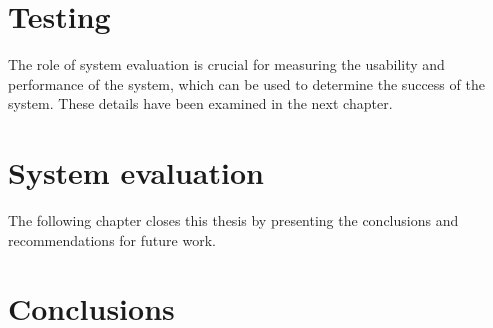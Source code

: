 \documentclass[
	paper=A4,
	titlepage=true,
	appendixprefix=true,
	headings=appendixwithoutprefixline,
	fontsize=11pt,
	parskip=half
]{scrreprt}
\begin{document}
	\chapter{Testing} {
	\label{ch:testing}
		
	}

	The role of system evaluation is crucial for measuring the usability and performance of the system, which can be used to determine the success of the system. These details have been examined in the next chapter.

	\chapter{System evaluation} {
	\label{ch:system_evaluation}
		
	}

	The following chapter closes this thesis by presenting the conclusions and recommendations for future work.

	\chapter{Conclusions} {
	\label{ch:conclusions}
		
	}
	
	\renewcommand{\bibname}{References}
	\printbibliography[notcategory=exclude]

	
	
\end{document}
